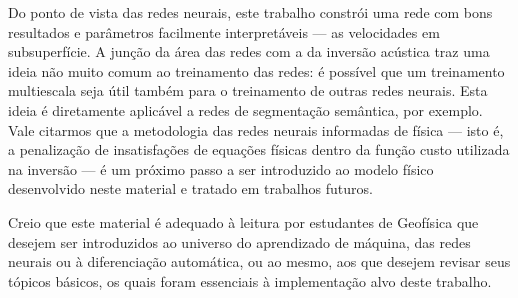   Do ponto de vista das redes neurais, este trabalho constrói uma rede com bons resultados e parâmetros facilmente interpretáveis --- as velocidades em subsuperfície. A junção da área das redes com a da inversão acústica traz uma ideia não muito comum ao treinamento das redes: é possível que um treinamento multiescala seja útil também para o treinamento de outras redes neurais. Esta ideia é diretamente aplicável a redes de segmentação semântica, por exemplo. Vale citarmos que a metodologia das redes neurais informadas de física --- isto é, a penalização de insatisfações de equações físicas dentro da função custo utilizada na inversão --- é um próximo passo a ser introduzido ao modelo físico desenvolvido neste material e tratado em trabalhos futuros.

  Creio que este material é adequado à leitura por estudantes de Geofísica que desejem ser introduzidos ao universo do aprendizado de máquina, das redes neurais ou à diferenciação automática, ou ao mesmo, aos que desejem revisar seus tópicos básicos, os quais foram essenciais à implementação alvo deste trabalho.
